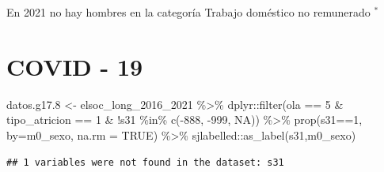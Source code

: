 \documentclass[
  12pt,
]{book}
\newenvironment{Shaded}{\begin{snugshade}}{\end{snugshade}}
\newcommand{\AttributeTok}[1]{\textcolor[rgb]{0.77,0.63,0.00}{#1}}
\newcommand{\ConstantTok}[1]{\textcolor[rgb]{0.00,0.00,0.00}{#1}}
\newcommand{\DecValTok}[1]{\textcolor[rgb]{0.00,0.00,0.81}{#1}}
\newcommand{\FloatTok}[1]{\textcolor[rgb]{0.00,0.00,0.81}{#1}}
\newcommand{\FunctionTok}[1]{\textcolor[rgb]{0.00,0.00,0.00}{#1}}
\newcommand{\NormalTok}[1]{#1}
\newcommand{\OtherTok}[1]{\textcolor[rgb]{0.56,0.35,0.01}{#1}}
\newcommand{\SpecialCharTok}[1]{\textcolor[rgb]{0.00,0.00,0.00}{#1}}
\begin{document}
En 2021 no hay hombres en la categoría Trabajo doméstico no remunerado \(^{*}\)

\hypertarget{covid---19}{%
\section{COVID - 19}\label{covid---19}}

\begin{Shaded}
\begin{Highlighting}[]
\NormalTok{datos.g17}\FloatTok{.8} \OtherTok{\textless{}{-}}\NormalTok{ elsoc\_long\_2016\_2021 }\SpecialCharTok{\%\textgreater{}\%} 
\NormalTok{  dplyr}\SpecialCharTok{::}\FunctionTok{filter}\NormalTok{(ola }\SpecialCharTok{==} \DecValTok{5} \SpecialCharTok{\&}\NormalTok{ tipo\_atricion }\SpecialCharTok{==} \DecValTok{1} \SpecialCharTok{\&} \SpecialCharTok{!}\NormalTok{s31 }\SpecialCharTok{\%in\%} \FunctionTok{c}\NormalTok{(}\SpecialCharTok{{-}}\DecValTok{888}\NormalTok{, }\SpecialCharTok{{-}}\DecValTok{999}\NormalTok{, }\ConstantTok{NA}\NormalTok{)) }\SpecialCharTok{\%\textgreater{}\%} 
  \FunctionTok{prop}\NormalTok{(s31}\SpecialCharTok{==}\DecValTok{1}\NormalTok{, }\AttributeTok{by=}\NormalTok{m0\_sexo, }\AttributeTok{na.rm =} \ConstantTok{TRUE}\NormalTok{) }\SpecialCharTok{\%\textgreater{}\%} 
\NormalTok{  sjlabelled}\SpecialCharTok{::}\FunctionTok{as\_label}\NormalTok{(s31,m0\_sexo)}
\end{Highlighting}
\end{Shaded}

\begin{verbatim}
## 1 variables were not found in the dataset: s31
\end{verbatim}
\end{document}
